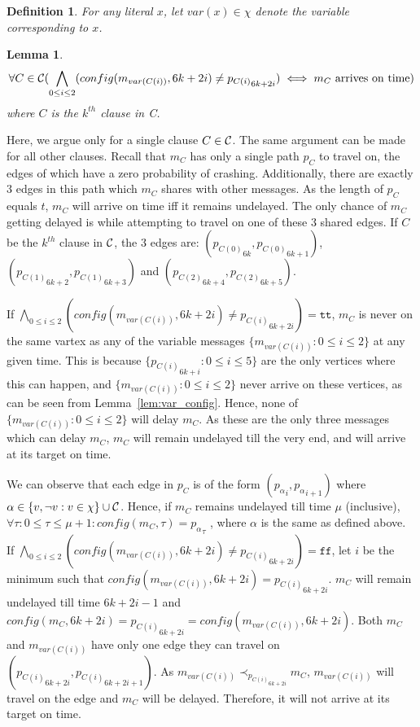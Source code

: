 \documentclass[11pt,eepic]{article}
\newcommand{\set}[1]{\{ #1  \}}
\newcommand{\C}{{\cal C}}
\renewcommand{\tt}{\texttt{tt}}
\newcommand{\ff}{\texttt{ff}}
\newtheorem{lemma}[theorem]{Lemma}
\newtheorem{definition}{Definition}[section]
\def\eod{\vrule height 6pt width 5pt depth 0pt}
\newenvironment{proof}{\noindent {\bf Proof:} \hspace{.677em}}
	                      {\hspace*{\fill}{\eod}}
\begin{document}
		\begin{definition}
		For any literal $x$, let $var(x) \in \chi$ denote the variable corresponding to $x$.
		\end{definition}


		\begin{lemma}
		\label{lem:clause_delay}
		\[\forall C\in\C (\bigwedge_{0 \leq i \leq 2}(config(m_{var(C(i))},6k+2i)\ne{p_{C(i)}}_{6k+2i}) \iff m_C \text{ arrives on time})\] where $C$ is the $k^{th}$ clause in \C.
		\end{lemma}
		\begin{proof}
		Here, we argue only for a single clause $C\in\C$. The same argument can be made for all other clauses. Recall that $m_C$ has only a single path $p_C$ to travel on, the edges of which have a zero probability of crashing. Additionally, there are exactly $3$ edges in this path which $m_C$ shares with other messages. As the length of $p_C$ equals $t$, $m_C$ will arrive on time iff it remains undelayed. The only chance of $m_C$  getting delayed is while attempting to travel on one of these $3$ shared edges. If $C$ be the $k^{th}$ clause in $\C$, the $3$ edges are: $({p_{C(0)}}_{6k},{p_{C(0)}}_{6k+1})$, $({p_{C(1)}}_{6k+2},{p_{C(1)}}_{6k+3})$ and $({p_{C(2)}}_{6k+4},{p_{C(2)}}_{6k+5})$.

		If $\bigwedge_{0 \leq i \leq 2}(config(m_{var(C(i))},6k+2i)\ne{p_{C(i)}}_{6k+2i}) = \tt$, $m_C$ is never on the same vartex as any of the variable messages $\set{m_{var(C(i))}: 0\leq i\leq2}$ at any given time. This is because $\set{{p_{C(i)}}_{6k+i}: 0\leq i\leq5}$ are the only vertices where this can happen, and $\set{m_{var(C(i))}: 0\leq i\leq2}$ never arrive on these vertices, as can be seen from Lemma~\ref{lem:var_config}. Hence, none of $\set{m_{var(C(i))}: 0\leq i\leq2}$ will delay $m_C$. As these are the only three messages which can delay $m_C$, $m_C$ will remain undelayed till the very end, and will arrive at its target on time. 

		We can observe that each edge in $p_C$ is of the form $({p_\alpha}_i,{p_\alpha}_{i+1})$ where $\alpha \in \set{v, \neg v: v \in \chi} \cup \C$. Hence, if $m_C$ remains undelayed till time $\mu$ (inclusive), $\forall \tau: 0\leq\tau\leq\mu+1: config(m_C,\tau)={p_\alpha}_\tau$ , where $\alpha$ is the same as defined above. If $\bigwedge_{0 \leq i \leq 2}(config(m_{var(C(i))},6k+2i)\ne{p_{C(i)}}_{6k+2i}) = \ff$, let $i$ be the minimum such that $config(m_{var(C(i))},6k+2i)={p_{C(i)}}_{6k+2i}$. $m_C$ will remain undelayed till time $6k+2i-1$ and $config(m_C,6k+2i)={p_{C(i)}}_{6k+2i}=config(m_{var(C(i))},6k+2i)$. Both $m_C$ and $m_{var(C(i))}$ have only one edge they can travel on $({p_{C(i)}}_{6k+2i},{p_{C(i)}}_{6k+2i+1})$. As $m_{var(C(i))} \prec_{{p_{C(i)}}_{6k+2i}} m_C$, $m_{var(C(i))}$ will travel on the edge and $m_C$ will be delayed. Therefore, it will not arrive at its target on time.
		\end{proof}
\end{document}
